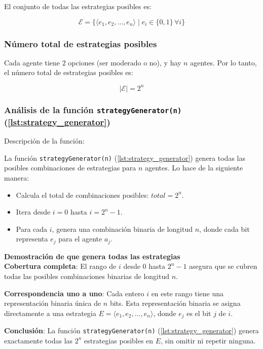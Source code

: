 \documentclass[letterpaper,10pt]{article}
\begin{document}
El conjunto de todas las estrategias posibles es:

\[
\mathcal{E} = \{\langle e_1, e_2, \dots, e_n \rangle \mid e_i \in \{0, 1\} \, \forall i\}
\]

\subsubsection*{Número total de estrategias posibles}

Cada agente tiene 2 opciones (ser moderado o no), y hay $n$ agentes. Por lo tanto, el número total de estrategias posibles es:

\[
|\mathcal{E}| = 2^n
\]

\subsubsection*{Análisis de la función \texttt{strategyGenerator(n)} (\ref{lst:strategy_generator})}

Descripción de la función:

La función \texttt{strategyGenerator(n)} (\ref{lst:strategy_generator}) genera todas las posibles combinaciones de estrategias para $n$ agentes. Lo hace de la siguiente manera:

\begin{itemize}
    \item Calcula el total de combinaciones posibles: $total = 2^n$.
    \item Itera desde $i = 0$ hasta $i = 2^n - 1$.
    \item Para cada $i$, genera una combinación binaria de longitud $n$, donde cada bit representa $e_j$ para el agente $a_j$.
\end{itemize}

\textbf{Demostración de que genera todas las estrategias}
\\

\textbf{Cobertura completa}: El rango de $i$ desde $0$ hasta $2^n - 1$ asegura que se cubren todas las posibles combinaciones binarias de longitud $n$.

\textbf{Correspondencia uno a uno}: Cada entero $i$ en este rango tiene una representación binaria única de $n$ bits. Esta representación binaria se asigna directamente a una estrategia $E = \langle e_1, e_2, \dots, e_n \rangle$, donde $e_j$ es el bit $j$ de $i$.

\textbf{Conclusión}: La función \texttt{strategyGenerator(n)} (\ref{lst:strategy_generator}) genera exactamente todas las $2^n$ estrategias posibles en $E$, sin omitir ni repetir ninguna.
\end{document}
